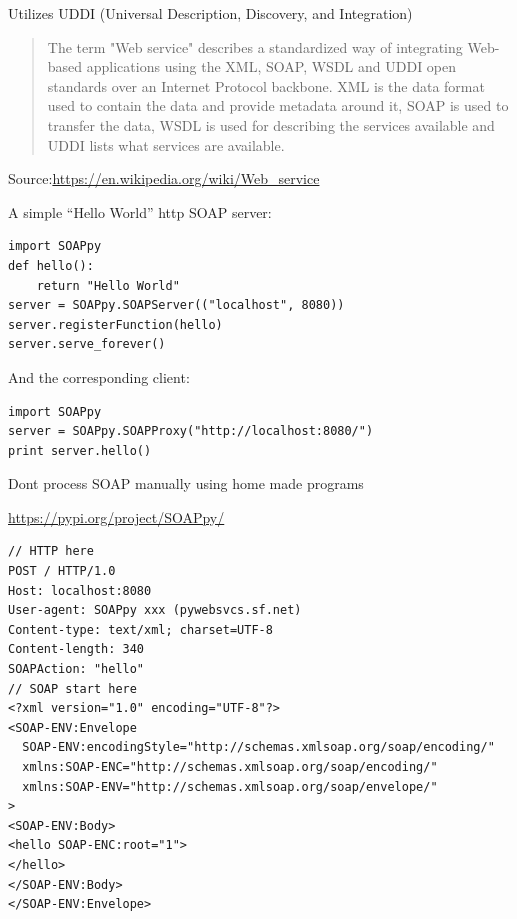 \documentclass[Screen16to9,17pt]{foils}
\begin{document}
Utilizes  UDDI (Universal Description, Discovery, and Integration)


\begin{quote}
The term "Web service" describes a standardized way of integrating Web-based applications using the XML, SOAP, WSDL and UDDI open standards over an Internet Protocol backbone. XML is the data format used to contain the data and provide metadata around it, SOAP is used to transfer the data, WSDL is used for describing the services available and UDDI lists what services are available.
\end{quote}
Source:\url{https://en.wikipedia.org/wiki/Web_service}



A simple “Hello World” http SOAP server:

\begin{verbatim}
import SOAPpy
def hello():
    return "Hello World"
server = SOAPpy.SOAPServer(("localhost", 8080))
server.registerFunction(hello)
server.serve_forever()
\end{verbatim}
And the corresponding client:

\begin{verbatim}
import SOAPpy
server = SOAPpy.SOAPProxy("http://localhost:8080/")
print server.hello()
\end{verbatim}


\begin{list2}
\item Dont process SOAP manually using home made programs
\item \url{https://pypi.org/project/SOAPpy/}
\end{list2}



\begin{verbatim}
// HTTP here
POST / HTTP/1.0
Host: localhost:8080
User-agent: SOAPpy xxx (pywebsvcs.sf.net)
Content-type: text/xml; charset=UTF-8
Content-length: 340
SOAPAction: "hello"
// SOAP start here
<?xml version="1.0" encoding="UTF-8"?>
<SOAP-ENV:Envelope
  SOAP-ENV:encodingStyle="http://schemas.xmlsoap.org/soap/encoding/"
  xmlns:SOAP-ENC="http://schemas.xmlsoap.org/soap/encoding/"
  xmlns:SOAP-ENV="http://schemas.xmlsoap.org/soap/envelope/"
>
<SOAP-ENV:Body>
<hello SOAP-ENC:root="1">
</hello>
</SOAP-ENV:Body>
</SOAP-ENV:Envelope>
\end{verbatim}
\end{document}
